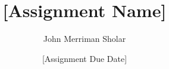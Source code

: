 \documentclass[10pt,letter]{article}
\begin{document}
\title{[Assignment Name]}
\author{John Merriman Sholar}
\date{[Assignment Due Date]}
\maketitle
\thispagestyle{empty}

\lipsum
\end{document}
